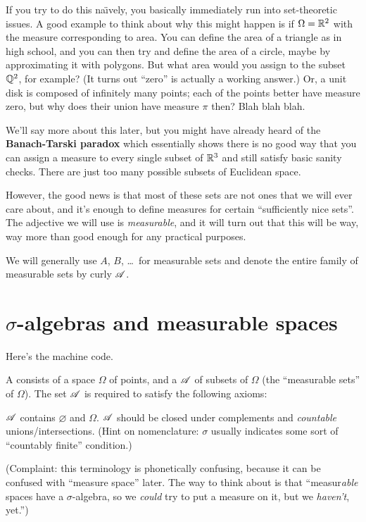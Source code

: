 If you try to do this na\"{\i}vely,
you basically immediately run into set-theoretic issues.
A good example to think about why this might happen
is if $\Omega = \mathbb R^2$ with the measure corresponding to area.
You can define the area of a triangle as in high school,
and you can then try and define the area of a circle,
maybe by approximating it with polygons.
But what area would you assign to the subset $\mathbb Q^2$, for example?
(It turns out ``zero'' is actually a working answer.)
Or, a unit disk is composed of infinitely many points;
each of the points better have measure zero,
but why does their union have measure $\pi$ then?
Blah blah blah.

We'll say more about this later, but
you might have already heard of the \textbf{Banach-Tarski paradox}
which essentially shows there is no good way that you can assign a
measure to every single subset of $\mathbb R^3$
and still satisfy basic sanity checks.
There are just too many possible subsets of Euclidean space.

However, the good news is that most of these sets are not ones
that we will ever care about,
and it's enough to define measures for certain
``sufficiently nice sets''.
The adjective we will use is \emph{measurable},
and it will turn out that this will be way, way more than good enough
for any practical purposes.

We will generally use $A$, $B$, \dots\ for measurable sets
and denote the entire family of measurable sets by curly $\mathscr A$.

\section{$\sigma$-algebras and measurable spaces}
Here's the machine code.
\begin{definition}
	A  consists of a space $\Omega$ of points,
	and a  $\mathscr A$ of subsets of $\Omega$
	(the ``measurable sets'' of $\Omega$).
	The set $\mathscr A$ is required to satisfy the following axioms:
	\begin{itemize}
		\ii $\mathscr A$ contains $\varnothing$ and $\Omega$.
		\ii $\mathscr A$ should be closed under complements and
		\emph{countable} unions/intersections.
		(Hint on nomenclature: $\sigma$ usually indicates
		some sort of ``countably finite'' condition.)
	\end{itemize}
\end{definition}
(Complaint: this terminology is phonetically confusing,
because it can be confused with ``measure space'' later.
The way to think about is that
``measur\emph{able} spaces have a $\sigma$-algebra, so we \emph{could}
try to put a measure on it, but we \emph{haven't}, yet.'')

